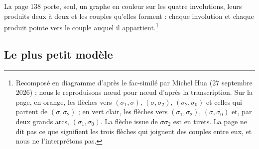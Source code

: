 \documentclass[11pt,a4paper]{article}
\begin{document}
La page 138 porte, seul, un graphe en couleur sur les quatre involutions, leurs
produits deux à deux et les couples qu'elles forment : chaque involution et
chaque produit pointe vers le couple auquel il appartient.\footnote{Recomposé en
diagramme d'après le fac-similé par Michel Hua (27 septembre 2026) ; nous le
reproduisons nœud pour nœud d'après la transcription. Sur la page, en orange,
les flèches vers $(\sigma_1, \sigma)$, $(\sigma, \sigma_2)$, $(\sigma_2,
\sigma_0)$ et celles qui partent de $(\sigma, \sigma_2)$ ; en vert clair, les
flèches vers $(\sigma_1, \sigma_2)$, $(\sigma, \sigma_0)$ et, par deux grands
arcs, $(\sigma_1, \sigma_0)$. La flèche issue de $\sigma\sigma_2$ est en tirets.
La page ne dit pas ce que signifient les trois flèches qui joignent des couples
entre eux, et nous ne l'interprétons pas.}


\subsection*{Le plus petit modèle}
\end{document}
